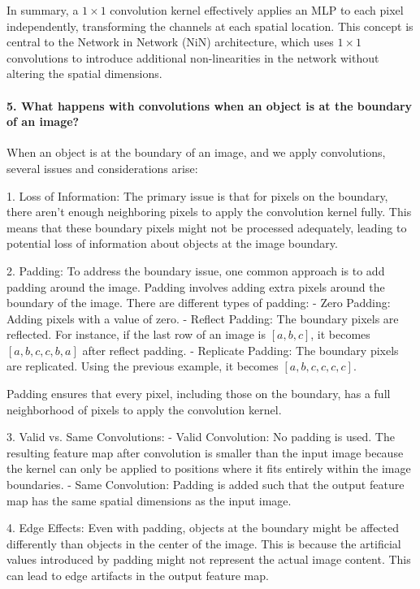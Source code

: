 In summary, a \( 1 \times 1 \) convolution kernel effectively applies an MLP to each pixel independently, transforming the channels at each spatial location.
This concept is central to the Network in Network (NiN) architecture, which uses \( 1 \times 1 \) convolutions to introduce additional non-linearities in the network without altering the spatial dimensions.

\paragraph{5. What happens with convolutions when an object is at the boundary of an image?}

When an object is at the boundary of an image, and we apply convolutions, several issues and considerations arise:

1. Loss of Information: The primary issue is that for pixels on the boundary, there aren't enough neighboring pixels to apply the convolution kernel fully.
This means that these boundary pixels might not be processed adequately, leading to potential loss of information about objects at the image boundary.

2. Padding: To address the boundary issue, one common approach is to add padding around the image. Padding involves adding extra pixels around the boundary of the image.
There are different types of padding:
- Zero Padding: Adding pixels with a value of zero.
- Reflect Padding: The boundary pixels are reflected. For instance, if the last row of an image is \([a, b, c]\), it becomes \([a, b, c, c, b, a]\) after reflect padding.
- Replicate Padding: The boundary pixels are replicated. Using the previous example, it becomes \([a, b, c, c, c, c]\).

Padding ensures that every pixel, including those on the boundary, has a full neighborhood of pixels to apply the convolution kernel.

3. Valid vs. Same Convolutions:
- Valid Convolution: No padding is used. The resulting feature map after convolution is smaller than the input image because the kernel can only be applied to positions where it fits entirely within the image boundaries.
- Same Convolution: Padding is added such that the output feature map has the same spatial dimensions as the input image.

4. Edge Effects: Even with padding, objects at the boundary might be affected differently than objects in the center of the image.
This is because the artificial values introduced by padding might not represent the actual image content. This can lead to edge artifacts in the output feature map.

